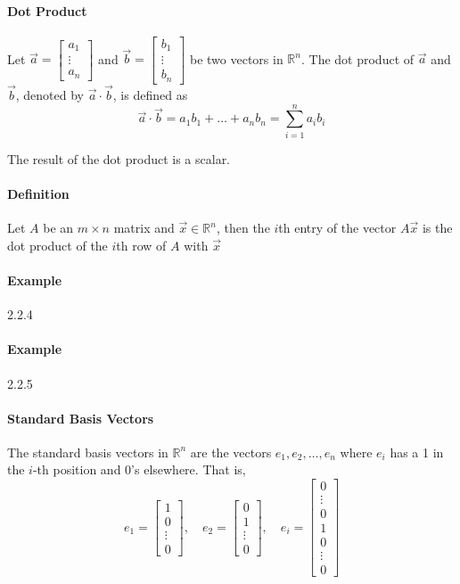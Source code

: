 \paragraph*{Dot Product}
Let $\vec{a} = \begin{bmatrix}
    a_1 \\
    \vdots \\
    a_n
\end{bmatrix}$ and $\vec{b} = \begin{bmatrix}
    b_1 \\
    \vdots \\
    b_n
\end{bmatrix}$ be two vectors in $\mathbb{R}^n$. The dot product of $\vec{a}$ and $\vec{b}$, denoted by $\vec{a} \cdot \vec{b}$, is defined as
\[\vec{a} \cdot \vec{b} = a_1b_1 + \ldots + a_nb_n = \sum_{i=1}^n a_ib_i\]

The result of the dot product is a scalar.

\paragraph*{Definition}
Let $A$ be an $m \times n$ matrix and $\vec{x} \in \mathbb{R}^n$, then the $i$th entry of the vector $A\vec{x}$ is 
the dot product of the $i$th row of $A$ with $\vec{x}$

\paragraph*{Example} 2.2.4

\paragraph*{Example} 2.2.5

\paragraph*{Standard Basis Vectors}
The standard basis vectors in $\mathbb{R}^n$ are the vectors $e_1, e_2, \ldots, e_n$ where $e_i$ has a 1 in the $i$-th position and 0's elsewhere. That is,
\[e_1 = \begin{bmatrix}
    1 \\
    0 \\
    \vdots \\
    0
\end{bmatrix}, \quad e_2 = \begin{bmatrix}
    0 \\
    1 \\
    \vdots \\
    0
\end{bmatrix}, \quad e_i = \begin{bmatrix}
    0 \\
    \vdots \\
    0 \\
    1 \\
    0 \\
    \vdots \\
    0
\end{bmatrix}\]

